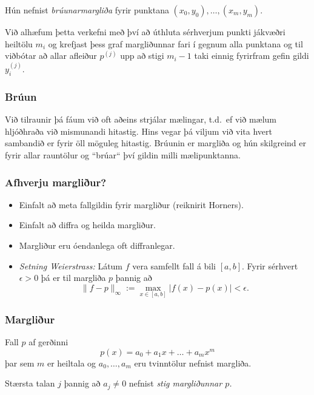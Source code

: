\documentclass[icelandic,a4paper,12pt]{article}
\begin{document}
\pause
\smallskip
Hún nefnist {\it brúunarmargliða} fyrir punktana
$(x_0,y_0),\dots,(x_m,y_m)$. 

\pause
\smallskip
Við alhæfum þetta verkefni með því 
að úthluta sérhverjum punkti jákvæðri heiltölu $m_i$ og krefjast
þess graf margliðunnar fari í gegnum alla punktana og til viðbótar
að allar afleiður $p^{(j)}$ upp að  stigi $m_i-1$ taki einnig fyrirfram
gefin gildi $y^{(j)}_i$.  


\subsubsection{Brúun}
  Við tilraunir þá fáum við oft aðeins strjálar mælingar, t.d.~ef við mælum hljóðhraða 
  við mismunandi hitastig. \pause Hins vegar þá viljum við vita hvert sambandið er fyrir öll möguleg 
  hitastig.
  Brúunin er margliða og hún skilgreind er fyrir allar rauntölur og ``brúar`` því gildin milli 
  mælipunktanna.
 

\pause

  \subsubsection{Afhverju margliður?}
   \begin{itemize}
    \item Einfalt að meta fallgildin fyrir margliður (reiknirit Horners). \pause
    \item Einfalt að diffra og heilda margliður. \pause
    \item Margliður eru óendanlega oft diffranlegar.\pause
    \item \emph{Setning Weierstrass:}
    Látum $f$ vera samfellt fall á bili $[a,b]$. Fyrir sérhvert $\epsilon > 0$ þá
    er til margliða $p$ þannig að 
    $$
      \|f-p\|_\infty := \max_{x\in [a,b]} |f(x)-p(x)| < \epsilon.
    $$
 \end{itemize}
  

%
\subsubsection{Margliður} 

Fall $p$ af gerðinni
\begin{equation*}
	p(x) = a_0 + a_1 x + \ldots + a_m x^m
\end{equation*}
þar sem $m$ er heiltala og $a_0, \ldots, a_m$ eru tvinntölur 
nefnist margliða. 

\pause
\smallskip
Stærsta talan $j$ þannig að $a_j \not= 0$ 
nefnist \em stig \em margliðunnar $p$. 
\end{document}
